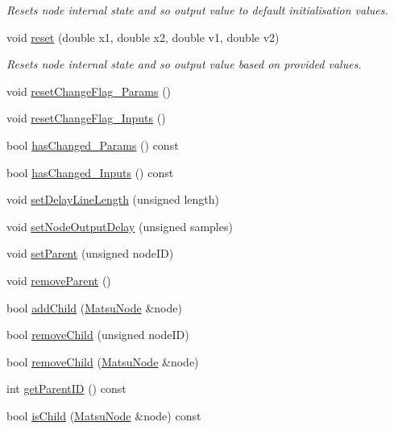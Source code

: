 \begin{DoxyCompactItemize}
\begin{DoxyCompactList}\small\item\em Resets node internal state and so output value to default initialisation values. \end{DoxyCompactList}\item 
void \hyperlink{classMatsuNode_a4649b0229d516bffa0129565b1805602}{reset} (double x1, double x2, double v1, double v2)
\begin{DoxyCompactList}\small\item\em Resets node internal state and so output value based on provided values. \end{DoxyCompactList}\item 
void \hyperlink{classMatsuNode_a155f3533b85aacccd528ce7b04e24289}{reset\+Change\+Flag\+\_\+\+Params} ()
\item 
void \hyperlink{classMatsuNode_a660a6945b92c6e50f8b17981f63ba6d4}{reset\+Change\+Flag\+\_\+\+Inputs} ()
\item 
bool \hyperlink{classMatsuNode_ae1cb6a1670959b209cfd68d634f3dbb1}{has\+Changed\+\_\+\+Params} () const 
\item 
bool \hyperlink{classMatsuNode_a69b3731ac308a48a46ccbb2c87de4e1c}{has\+Changed\+\_\+\+Inputs} () const 
\item 
void \hyperlink{classMatsuNode_a6b5b32c4489129fd184638a9c9ed36d4}{set\+Delay\+Line\+Length} (unsigned length)
\item 
void \hyperlink{classMatsuNode_ae4d26af98e34d1595cb9cc65a89ea8ff}{set\+Node\+Output\+Delay} (unsigned samples)
\item 
void \hyperlink{classMatsuNode_ab357c154c95d3e289921cc79ef8cf94e}{set\+Parent} (unsigned node\+ID)
\item 
void \hyperlink{classMatsuNode_aadd9d80a48b3c5f2bcfed3801f644e24}{remove\+Parent} ()
\item 
bool \hyperlink{classMatsuNode_a7056a59c333c238b2a583b59bcdb278d}{add\+Child} (\hyperlink{classMatsuNode}{Matsu\+Node} \&node)
\item 
bool \hyperlink{classMatsuNode_aa6251aafed3ea1af9ee0548a5707901c}{remove\+Child} (unsigned node\+ID)
\item 
bool \hyperlink{classMatsuNode_a0e170c6154bbc7ba1f668f7d0a9ac274}{remove\+Child} (\hyperlink{classMatsuNode}{Matsu\+Node} \&node)
\item 
int \hyperlink{classMatsuNode_a5a9d7f1c6d77be20548d75a8614ca000}{get\+Parent\+ID} () const 
\item 
bool \hyperlink{classMatsuNode_a9f2b986bfe8e7046a98428445c547d31}{is\+Child} (\hyperlink{classMatsuNode}{Matsu\+Node} \&node) const 

\end{DoxyCompactItemize}
